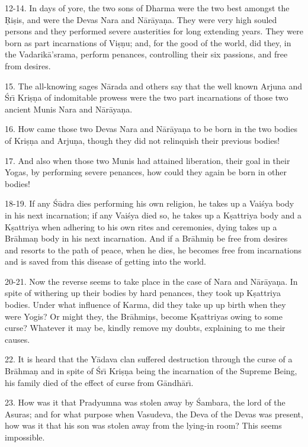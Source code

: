 12-14. In days of yore, the two sons of Dharma were the two best amongst the \d{R}i\d{s}is, and were the Devas Nara and N\=ar\=aya\d{n}a. They were very high souled persons and they performed severe austerities for long extending years. They were born as part incarnations of Vi\d{s}\d{n}u; and, for the good of the world, did they, in the Vadarik\=a'srama, perform penances, controlling their six passions, and free from desires.

15. The all-knowing sages N\=arada and others say that the well known Arjuna and \'Sr\={\i} Kri\d{s}\d{n}a of indomitable prowess were the two part incarnations of those two ancient Munis Nara and N\=ar\=aya\d{n}a.

16. How came those two Devas Nara and N\=ar\=aya\d{n}a to be born in the two bodies of Kri\d{s}\d{n}a and Arju\d{n}a, though they did not relinquish their previous bodies!

17. And also when those two Munis had attained liberation, their goal in their Yogas, by performing severe penances, how could they again be born in other bodies!

18-19. If any \'S\=udra dies performing his own religion, he takes up a Vai\'sya body in his next incarnation; if any Vai\'sya died so, he takes up a K\d{s}attriya body and a K\d{s}attriya when adhering to his own rites and ceremonies, dying takes up a Br\=ahma\d{n} body in his next incarnation. And if a Br\=ahmi\d{n} be free from desires and resorts to the path of peace, when he dies, he becomes free from incarnations and is saved from this disease of getting into the world.

20-21. Now the reverse seems to take place in the case of Nara and N\=ar\=aya\d{n}a. In spite of withering up their bodies by hard penances, they took up K\d{s}attriya bodies. Under what influence of Karma, did they take up up birth when they were Yogis? Or might they, the Br\=ahmi\d{n}s, become K\d{s}attriyas owing to some curse? Whatever it may be, kindly remove my doubts, explaining to me their causes.

22. It is heard that the Y\=adava clan suffered destruction through the curse of a Br\=ahma\d{n} and in spite of \'Sr\={\i} Kri\d{s}\d{n}a being the incarnation of the Supreme Being, his family died of the effect of curse from G\=andh\=ar\={\i}.

23. How was it that Pradyumna was stolen away by \'Sambara, the lord of the Asuras; and for what purpose when Vasudeva, the Deva of the Devas was present, how was it that his son was stolen away from the lying-in room? This seems impossible.

